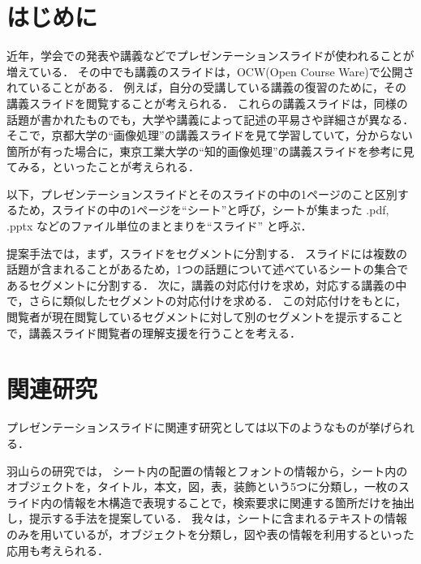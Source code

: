 \documentclass{js}
\begin{document}
\pagestyle{empty}
\maketitle










\section{はじめに}

近年，学会での発表や講義などでプレゼンテーションスライドが使われることが増えている．
その中でも講義のスライドは，OCW(Open Course Ware)で公開されていることがある．
例えば，自分の受講している講義の復習のために，その講義スライドを閲覧することが考えられる．
これらの講義スライドは，同様の話題が書かれたものでも，大学や講義によって記述の平易さや詳細さが異なる．
そこで，京都大学の``画像処理''の講義スライドを見て学習していて，分からない箇所が有った場合に，東京工業大学の``知的画像処理''の講義スライドを参考に見てみる，といったことが考えられる．

以下，プレゼンテーションスライドとそのスライドの中の1ページのこと区別するため，スライドの中の1ページを``シート''と呼び，シートが集まった .pdf, .pptx などのファイル単位のまとまりを``スライド'' と呼ぶ．

提案手法では，まず，スライドをセグメントに分割する．
スライドには複数の話題が含まれることがあるため，1つの話題について述べているシートの集合であるセグメントに分割する．
次に，講義の対応付けを求め，対応する講義の中で，さらに類似したセグメントの対応付けを求める．
この対応付けをもとに，閲覧者が現在閲覧しているセグメントに対して別のセグメントを提示することで，講義スライド閲覧者の理解支援を行うことを考える．












\section{関連研究}

プレゼンテーションスライドに関連す研究としては以下のようなものが挙げられる．

羽山ら\cite{hayama2010}の研究では，
シート内の配置の情報とフォントの情報から，シート内のオブジェクトを，タイトル，本文，図，表，装飾という5つに分類し，一枚のスライド内の情報を木構造で表現することで，検索要求に関連する箇所だけを抽出し，提示する手法を提案している．
我々は，シートに含まれるテキストの情報のみを用いているが，オブジェクトを分類し，図や表の情報を利用するといった応用も考えられる．
\end{document}
